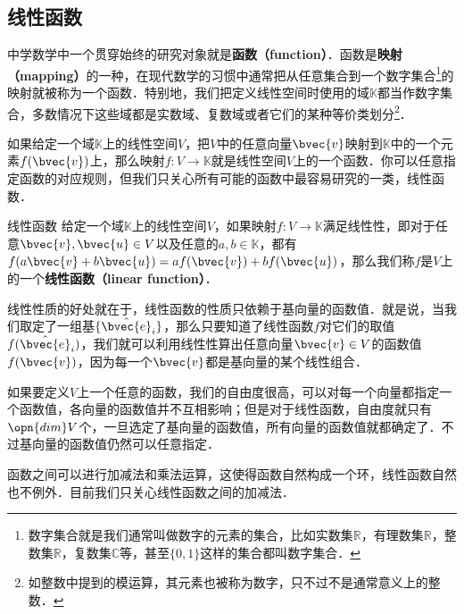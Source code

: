 
\begin{issues}
\issueTODO
\end{issues}


\subsection{线性函数}

中学数学中一个贯穿始终的研究对象就是\textbf{函数（function）}．函数是\textbf{映射（mapping）}的一种，在现代数学的习惯中通常把从任意集合到一个数字集合\footnote{数字集合就是我们通常叫做数字的元素的集合，比如实数集$\mathbb{R}$，有理数集$\mathbb{R}$，整数集$\mathbb{R}$，复数集$\mathbb{C}$等，甚至$\{0, 1\}$这样的集合都叫数字集合．}的映射就被称为一个函数．特别地，我们把定义线性空间时使用的域$\mathbb{K}$都当作数字集合，多数情况下这些域都是实数域、复数域或者它们的某种等价类划分\footnote{如整数中提到的模运算，其元素也被称为数字，只不过不是通常意义上的整数．}．

如果给定一个域$\mathbb{K}$上的线性空间$V$，把$V$中的任意向量$\bvec{v}$映射到$\mathbb{K}$中的一个元素$f(\bvec{v})$上，那么映射$f:V\rightarrow\mathbb{K}$就是线性空间$V$上的一个函数．你可以任意指定函数的对应规则，但我们只关心所有可能的函数中最容易研究的一类，线性函数．

\begin{definition}{线性函数}
给定一个域$\mathbb{K}$上的线性空间$V$，如果映射$f:V\rightarrow\mathbb{K}$满足线性性，即对于任意$\bvec{v}, \bvec{u}\in V$以及任意的$a, b\in\mathbb{K}$，都有$f(a\bvec{v}+b\bvec{u})=af(\bvec{v})+bf(\bvec{u})$，那么我们称$f$是$V$上的一个\textbf{线性函数（linear function）}．
\end{definition}

线性性质的好处就在于，线性函数的性质只依赖于基向量的函数值．就是说，当我们取定了一组基$\{\hat{\bvec{e}}_i\}$，那么只要知道了线性函数$f$对它们的取值$f(\hat{\bvec{e}}_i)$，我们就可以利用线性性算出任意向量$\bvec{v}\in V$的函数值$f(\bvec{v})$，因为每一个$\bvec{v}$都是基向量的某个线性组合．

如果要定义$V$上一个任意的函数，我们的自由度很高，可以对每一个向量都指定一个函数值，各向量的函数值并不互相影响；但是对于线性函数，自由度就只有$\opn{dim} V$个，一旦选定了基向量的函数值，所有向量的函数值就都确定了．不过基向量的函数值仍然可以任意指定．

函数之间可以进行加减法和乘法运算，这使得函数自然构成一个环，线性函数自然也不例外．目前我们只关心线性函数之间的加减法．

